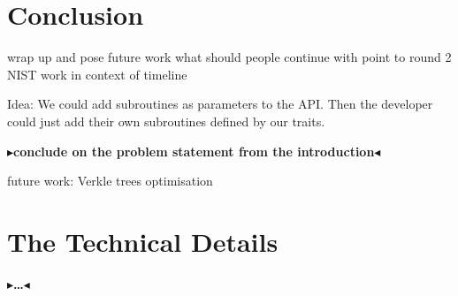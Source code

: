 \documentclass[twoside,11pt]{report}
\theoremstyle{definition}
\theoremstyle{plain}
\newcommand{\todo}[1]{{\color[rgb]{.5,0,0}\textbf{$\blacktriangleright$#1$\blacktriangleleft$}}}
\begin{document}
\chapter{Conclusion}\label{ch:conclusion}

wrap up and pose future work
what should people continue with
point to round 2 NIST
work in context of timeline

Idea: We could add subroutines as parameters to the API. Then the developer could just add their own subroutines defined by our traits.

\todo{conclude on the problem statement from the introduction}

future work: Verkle trees optimisation


\cleardoublepage
{}




\cleardoublepage
\appendix
\chapter{The Technical Details}

\todo{\dots}
\end{document}
